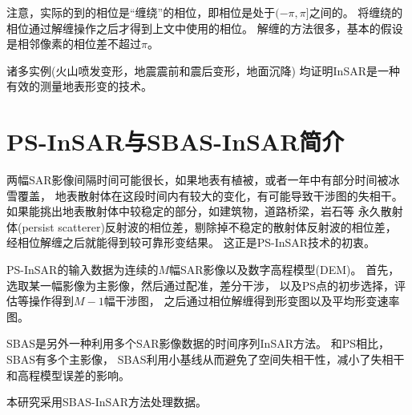 注意，实际的到的相位是“缠绕”的相位，即相位是处于$(-\pi,\pi]$之间的。
将缠绕的相位通过解缠操作之后才得到上文中使用的相位。
解缠的方法很多，基本的假设是相邻像素的相位差不超过$\pi$。

诸多实例(火山喷发变形，地震震前和震后变形，地面沉降)
均证明InSAR是一种有效的测量地表形变的技术。
\section{PS-InSAR与SBAS-InSAR简介}

两幅SAR影像间隔时间可能很长，如果地表有植被，或者一年中有部分时间被冰雪覆盖，
地表散射体在这段时间内有较大的变化，有可能导致干涉图的失相干。
如果能挑出地表散射体中较稳定的部分，如建筑物，道路桥梁，岩石等
永久散射体(persist scatterer)反射波的相位差，剔除掉不稳定的散射体反射波的相位差，
经相位解缠之后就能得到较可靠形变结果。
这正是PS-InSAR技术的初衷。

PS-InSAR的输入数据为连续的$M$幅SAR影像以及数字高程模型(DEM)。
首先，选取某一幅影像为主影像，然后通过配准，差分干涉，
以及PS点的初步选择，评估等操作得到$M-1$幅干涉图，
之后通过相位解缠得到形变图以及平均形变速率图。

SBAS是另外一种利用多个SAR影像数据的时间序列InSAR方法。
和PS相比，SBAS有多个主影像，
SBAS利用小基线从而避免了空间失相干性，减小了失相干和高程模型误差的影响。

本研究采用SBAS-InSAR方法处理数据。
